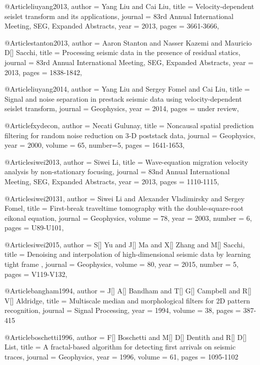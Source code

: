 @Article{liuyang2013,
  author = 	 {Yang Liu and Cai Liu},
  title = 	 {Velocity-dependent seislet transform and its applications},
  journal = 	 {83rd Annual International Meeting, SEG, Expanded Abstracts},
  year = 	 2013,
  pages =	 {3661-3666},
}

@Article{stanton2013,
  author = 	 {Aaron Stanton and Nasser Kazemi and Mauricio D[] Sacchi},
  title = 	 {Processing seismic data in the presence of residual statics},
  journal = 	 {83rd Annual International Meeting, SEG, Expanded Abstracts},
  year = 	 2013,
  pages =	 {1838-1842},
}

@Article{liuyang2014,
  author =	 { Yang Liu and Sergey Fomel and Cai Liu},
  title =	 {Signal and noise separation in prestack seismic data using velocity-dependent seislet transform},
  journal =	 {Geophysics},
  year =	 2014,
  pages =	 {under review},
}

@Article{fxydecon,
  author =	 {Necati Gulunay},
  title =	 {Noncausal spatial prediction filtering for random noise reduction on 3-D poststack data},
  journal =	 {Geophysics},
  year =	 2000,
  volume = 65,
  number={5}, 
  pages =	 {1641-1653},
}	



@Article{siwei2013,
  author = 	 {Siwei Li},
  title = 	 {Wave-equation migration velocity analysis by non-stationary focusing},
  journal = 	 {83nd Annual International Meeting, SEG, Expanded Abstracts},
  year = 	 2013,
  pages =	 {1110-1115},
}

@Article{siwei20131,
  author =	 { Siwei Li and Alexander Vladimirsky and Sergey Fomel},
  title =	 { First-break traveltime tomography with the
double-square-root eikonal equation},
  journal =	 {Geophysics},
  volume =	 78,
  year =	 2003,
  number =	 6,
  pages =	 {U89-U101},
}

@Article{siwei2015,
  author =	 { S[] Yu and J[] Ma and X[] Zhang and M[] Sacchi},
  title =	 { Denoising and interpolation of high-dimensional seismic data by learning tight frame },
  journal =	 {Geophysics},
  volume =	 80,
  year =	 2015,
  number =	 5,
  pages =	 {V119-V132},
}



@Article{bangham1994,
  author = 	 {J[] A[] Bandham and T[] G[] Campbell and R[] V[] Aldridge},
  title = 	 {Multiscale median and morphological filters for 2D pattern recognition},
  journal = 	 { Signal Processing},
  year = 	 1994,
  volume = 	 38,
  pages = 	 {387-415}}
  
  @Article{boschetti1996,
  author = 	 {F[] Boschetti and M[] D[] Dentith and R[] D[] List},
  title = 	 {A fractal-based algorithm for detecting first arrivals on seismic traces},
  journal = 	 {Geophysics},
  year = 	 1996,
  volume = 	 61,
  pages = 	 {1095-1102}}

